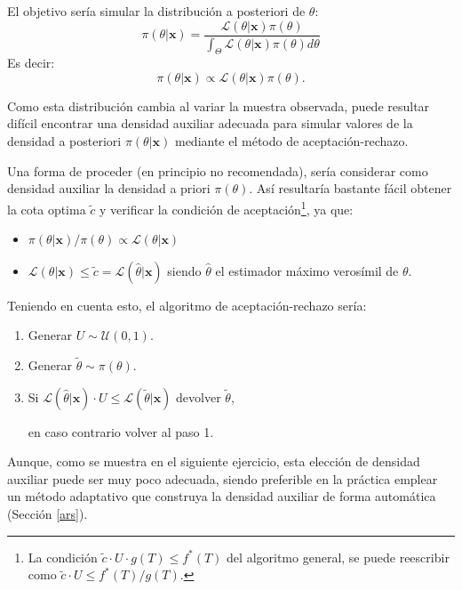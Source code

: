 \documentclass[
  spanish,
  10pt,
]{book}
\renewcommand{\mathbf}[1]{\symbf{#1}}
\theoremstyle{break}
\theoremstyle{nonumberplain}
\let\oldfootnote\footnote
\renewcommand\footnote[1]{\oldfootnote{\hspace{2mm}#1}}
\begin{document}
El objetivo sería simular la distribución a posteriori de \(\theta\):
\[\pi(\theta|\mathbf{x}) = \frac{\mathcal{L}(\theta | \mathbf{x})\pi(\theta)}{\int_\Theta \mathcal{L}(\theta | \mathbf{x})\pi(\theta)d\theta}\]
Es decir:
\[\pi(\theta | \mathbf{x}) \propto \mathcal{L}(\theta | \mathbf{x})\pi(\theta).\]

Como esta distribución cambia al variar la muestra observada, puede resultar difícil encontrar una densidad auxiliar adecuada para simular valores de la densidad a posteriori \(\pi(\theta|\mathbf{x})\) mediante el método de aceptación-rechazo.

Una forma de proceder (en principio no recomendada), sería considerar como densidad auxiliar la densidad a priori \(\pi(\theta)\).
Así resultaría bastante fácil obtener la cota optima \(\tilde{c}\) y verificar la condición de aceptación\footnote{La condición \(\tilde{c} \cdot U \cdot g(T) \leq f^{\ast}(T)\) del algoritmo general, se puede reescribir como \(\tilde{c} \cdot U \leq f^{\ast}(T) / g(T)\).}, ya que:

\begin{itemize}
\item
  \(\pi(\theta |\mathbf{x})/\pi(\theta)\propto \mathcal{L}(\theta | \mathbf{x})\)
\item
  \(\mathcal{L}(\theta | \mathbf{x}) \leq \tilde{c} = \mathcal{L}(\hat{\theta} | \mathbf{x})\) siendo
  \(\hat{\theta}\) el estimador máximo verosímil de \(\theta\).
\end{itemize}

Teniendo en cuenta esto, el algoritmo de aceptación-rechazo sería:

\begin{enumerate}
\def\labelenumi{\arabic{enumi}.}
\item
  Generar \(U \sim \mathcal{U}(0, 1)\).
\item
  Generar \(\tilde{\theta}\sim \pi(\theta)\).
\item
  Si \(\mathcal{L}(\hat{\theta} | \mathbf{x}) \cdot U \leq
  \mathcal{L}(\tilde{\theta} | \mathbf{x})\) devolver \(\tilde{\theta}\),

  en caso contrario volver al paso 1.
\end{enumerate}

Aunque, como se muestra en el siguiente ejercicio, esta elección de densidad auxiliar puede ser muy poco adecuada, siendo preferible en la práctica emplear un método adaptativo que construya la densidad auxiliar de forma automática (Sección \ref{ars}).
\end{document}
